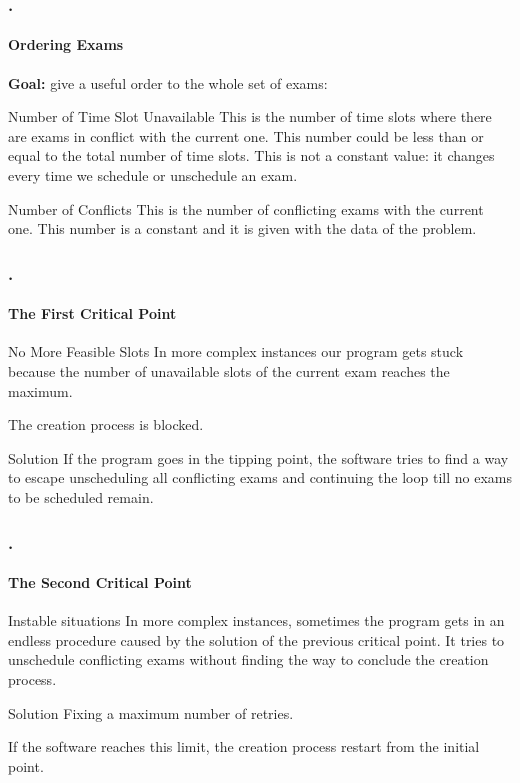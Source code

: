 \documentclass{beamer}
\begin{document}
	\begin{frame}
	   \frametitle{\thesection.\thesubsection \ \insertsubsection}
	   \framesubtitle{Ordering Exams}
	   
	\textbf{Goal:} give a useful \alert{order} to the whole set of exams:
	\begin{block}{Number of Time Slot Unavailable}
		This is the number of time slots where there are exams in conflict with the current one. This number could be less than or \alert{equal} to the total number of time slots. This is not a constant value: it changes every time we schedule or unschedule an exam.
	\end{block}
	\begin{block}{Number of Conflicts}
		This is the number of conflicting exams with the current one. This number is a constant and it is given with the data of the problem.
	\end{block}
	\end{frame}

\begin{frame}
\frametitle{\thesection.\thesubsection \ \insertsubsection}
\framesubtitle{The First Critical Point}
\begin{alertblock}{No More Feasible Slots}
	In more complex instances our program gets stuck because the number of unavailable slots of the current exam reaches the maximum.
	
	The creation process is \alert{blocked}.
\end{alertblock}
\pause
\begin{block}{Solution}
	 If the program goes in the tipping point, the software tries to find a way to escape \alert{unscheduling all conflicting exams} and continuing the loop till no exams to be scheduled remain.
\end{block}

\end{frame}

\begin{frame}
\frametitle{\thesection.\thesubsection \ \insertsubsection}
\framesubtitle{The Second Critical Point}
\begin{alertblock}{Instable situations}
	In more complex instances, sometimes the program gets in an endless procedure caused by the solution of the previous critical point. It tries to unschedule conflicting exams \alert{without finding the way to conclude} the creation process.

\end{alertblock}
\pause
\begin{block}{Solution}
	\alert{Fixing a maximum number of retries}.
	
	If the software reaches this limit, the creation process restart from the initial point.
\end{block}

\end{frame}
\end{document}
